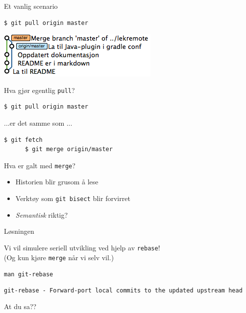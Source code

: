 \documentclass{beamer}
\begin{document}
\begin{frame}[fragile]{Et vanlig scenario}
    \begin{lstlisting}[language=bash]
      $ git pull origin master
    \end{lstlisting}
    \medskip
    \pause
    \includegraphics[scale=0.7]{2.png}
\end{frame}

\begin{frame}[fragile]{Hva gjør egentlig \texttt{pull}?}
    \begin{lstlisting}[language=bash]
      $ git pull origin master
    \end{lstlisting}
    \medskip
    ...er det samme som ...
    \medskip
    \begin{lstlisting}[language=bash]
      $ git fetch
      $ git merge origin/master
    \end{lstlisting}
\end{frame}


\begin{frame}{Hva er galt med \texttt{merge}?}
    \begin{itemize}
        \item<1-1> Historien blir grusom å lese
        \item<2-2> Verktøy som \texttt{git bisect} blir forvirret
        \item<3-3> \emph{Semantisk} riktig?
    \end{itemize}
\end{frame}

\begin{frame}{Løsningen}
    \begin{center}
        Vi vil simulere seriell utvikling ved hjelp av \texttt{rebase}!\\
        \medskip
        \pause
        (Og kun kjøre \texttt{merge} når vi selv vil.)
    \end{center}
\end{frame}

\begin{frame}[fragile]{\texttt{man git-rebase}}
    \begin{lstlisting}[]
git-rebase - Forward-port local commits to the updated upstream head
    \end{lstlisting}
    \medskip
    \pause
    At du sa??
\end{frame}
\end{document}
